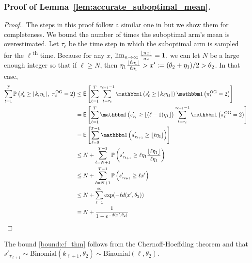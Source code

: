\subsubsection{Proof of Lemma~\ref{lem:accurate_suboptimal_mean}.} \label{prf:proof_of_acc_sub_means}
\begin{proof}[Proof.]
	The steps in this proof follow a similar one in \cite{agrawal2013further} but we show them for completeness. We bound the number of times the suboptimal arm's mean is overestimated. Let $\tau_\ell$ be the time step in which the  suboptimal arm is sampled for the $\ell$\textsuperscript{th} time. Because for any $x$, $\lim_{n\to\infty}\frac{\lfloor nx\rfloor}{nx} = 1$, we can let $N$ be a large enough integer so that if $\ell \ge N$, then $\eta_1 \frac{\lfloor\ell \eta_1\rfloor}{\ell \eta_1} > x' := (\theta_2 + \eta_1)/2 > \theta_2$. In that case,
	\begin{align}
	\sum_{t=1}^T\P{s'_t \ge \floor{k_t \eta_1}, \; \pi^{\rm OG}_t = 2} & \le \Ee{\sum_{\ell=1}^T \sum_{t=\tau_\ell}^{\tau_{\ell+1}-1}\ind{s'_{\ell} \ge \floor{k_{\ell} \eta_1}} \ind{\pi^{\rm OG}_t = 2}} \nonumber \\
	& = \Ee{\sum_{\ell=1}^T \ind{s'_{\tau_{\ell}} \ge \floor{(\ell-1) \eta_1}} \sum_{t=\tau_\ell}^{\tau_{\ell+1}-1} \ind{\pi^{\rm OG}_t = 2}} \nonumber\\
	& = \Ee{\sum_{\ell=0}^{T-1} \ind{s'_{\tau_{\ell+1}} \ge \floor{\ell \eta_1}}} \nonumber\\
	& \le  N + \sum_{\ell=N+1}^{T-1} \P{ s'_{\tau_{\ell+1}} \ge \ell \eta_1 \frac{\floor{\ell \eta_1}}{\ell \eta_1}} \nonumber \\
	& \le N + \sum_{\ell=N+1}^{T-1} \P{ s'_{\tau_{\ell+1}} \ge \ell x'} \nonumber \\
	& \le  N + \sum_{\ell=1}^{\infty} \exp(-\ell d(x', \theta_2)) \label{bound:cf_thm} \\
	& = N + \frac{1}{1 - e^{-d(x',\theta_2)}} \nonumber
	\end{align}
\end{proof}
The bound \eqref{bound:cf_thm} follows from the Chernoff-Hoeffding theorem and that $s'_{\tau_{\ell+1}} \sim \text{Binomial}(k_{\ell+1}, \theta_2) \sim \text{Binomial}(\ell, \theta_2)$.